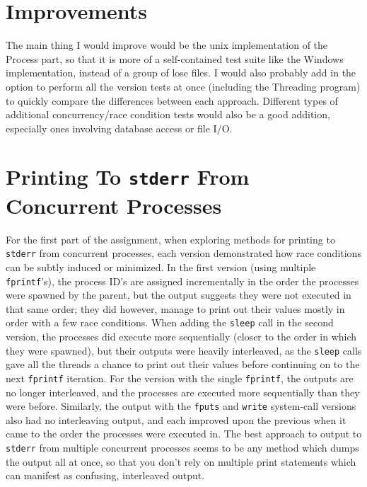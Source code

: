 \documentclass[12pt]{article}
\begin{document}
\section*{Improvements}
The main thing I would improve would be the unix implementation of the Process part, so that it is more of a self-contained test suite like the Windows 
implementation, instead of a group of lose files. I would also probably add in the option to perform all the version tests at once (including the Threading
program) to quickly compare the differences between each approach. Different types of additional concurrency/race condition tests would also be a good addition, 
especially ones involving database access or file I/O.


\section*{Printing To \texttt{stderr} From Concurrent Processes}
For the first part of the assignment, when exploring methods for printing to \texttt{stderr} from concurrent processes, each version demonstrated how race conditions
can be subtly induced or minimized. In the first version (using multiple \texttt{fprintf}'s), the process ID's are assigned incrementally in the order the processes 
were spawned by the parent, but the output suggests they were not executed in that same order; they did however, manage to print out their values mostly in order with
a few race conditions. When adding the \texttt{sleep} call in the second version, the processes did execute more sequentially (closer to the order in which they were spawned),
but their outputs were heavily interleaved, as the \texttt{sleep} calls gave all the threads a chance to print out their values before continuing on to the next \texttt{fprintf}
iteration. For the version with the single \texttt{fprintf}, the outputs are no longer interleaved, and the processes are executed more sequentially than they were before. Similarly,
the output with the \texttt{fputs} and \texttt{write} system-call versions also had no interleaving output, and each improved upon the previous when it came to the order the
processes were executed in.  The best approach to output to \texttt{stderr} from multiple concurrent processes seems to be any method which dumps the output all at once, so that you 
don't rely on multiple print statements which can manifest as confusing, interleaved output.

\end{document}
